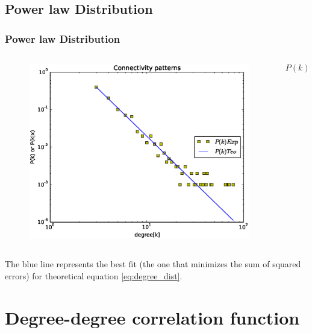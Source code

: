 \documentclass{beamer}
\begin{document}
\subsection{Power law Distribution}


\begin{frame}\frametitle{Power law Distribution}
\begin{columns}
\begin{column}{6.5cm}
\begin{figure}[hbt!]
\includegraphics[width=1.0\textwidth]{./temp/exp/results/Image02.eps}

\end{figure}
\end{column}
\begin{column}{3.5cm}
\begin{equation}
\label{eq:degree_dist}
P(k)=Ck{-\gamma}
\end{equation}
\end{column}
\end{columns}


The blue line represents the best fit (the one that minimizes the sum of squared errors) for theoretical equation \ref{eq:degree_dist}.


\end{frame}
	

\section{Degree-degree correlation function}
\end{document}
